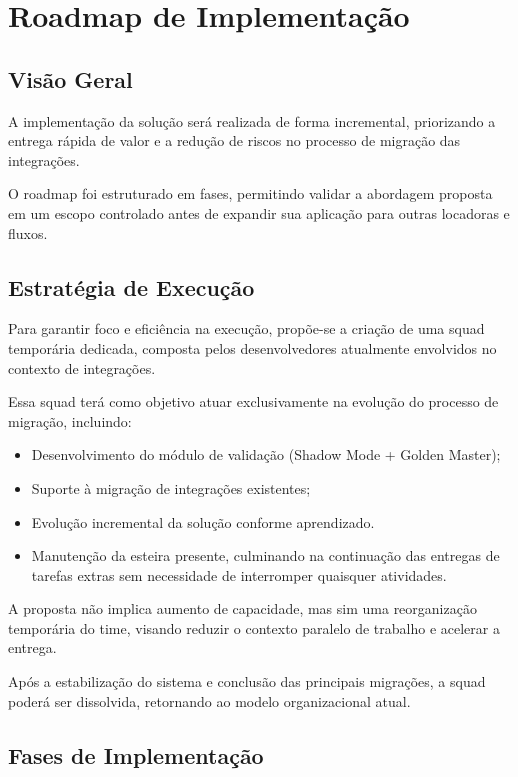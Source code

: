 \section{Roadmap de Implementação}

\subsection{Visão Geral}

A implementação da solução será realizada de forma incremental, priorizando a entrega rápida de valor e a redução de riscos no processo de migração das integrações.

O roadmap foi estruturado em fases, permitindo validar a abordagem proposta em um escopo controlado antes de expandir sua aplicação para outras locadoras e fluxos.

\subsection{Estratégia de Execução}

Para garantir foco e eficiência na execução, propõe-se a criação de uma squad temporária dedicada, composta pelos desenvolvedores atualmente envolvidos no contexto de integrações.

Essa squad terá como objetivo atuar exclusivamente na evolução do processo de migração, incluindo:

\begin{itemize}
    \item Desenvolvimento do módulo de validação (Shadow Mode + Golden Master);
    \item Suporte à migração de integrações existentes;
    \item Evolução incremental da solução conforme aprendizado.
    \item Manutenção da esteira presente, culminando na continuação das entregas de tarefas extras sem necessidade de interromper quaisquer atividades.
\end{itemize}

A proposta não implica aumento de capacidade, mas sim uma reorganização temporária do time, visando reduzir o contexto paralelo de trabalho e acelerar a entrega.

Após a estabilização do sistema e conclusão das principais migrações, a squad poderá ser dissolvida, retornando ao modelo organizacional atual.

\subsection{Fases de Implementação}

